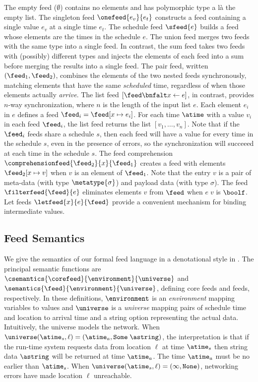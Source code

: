 The empty feed ($\emptyset$) contains no elements and has polymorphic
type a l\`a the empty list.  The singleton feed $\onefeed{e_v}{e_t}$
constructs a feed containing a single value $e_v$ at a single time
$e_t$.  The schedule feed $\sfeed{e}$ builds a feed whose elements 
are the times in the schedule $e$.
The union feed merges two feeds with the same type
into a single feed.  In contrast, the sum feed takes two feeds
with (possibly) different types and injects the elements of each feed
into a sum before merging the results into a single feed.  
The pair feed, written $(\feed_1, \feed_2)$, combines the elements of
the two nested feeds synchronously, matching elements that have the
same {\em scheduled} time, regardless of when those elements
actually {\em arrive}.
The list feed $[\feed \bnfalt x \leftarrow e ]$, in contrast, provides
$n$-way synchronization, where $n$ is the length of the input list
$e$.  Each element $e_i$ in $e$ defines a feed $\feed_i = \feed[x \mapsto e_i]$.
For each time $\atime$ with a value $v_i$ in each feed $\feed_i$, the
list feed returns the list $[v_1, \ldots, v_n]$.  Note that if the
$\feed_i$ feeds share a schedule $s$, then each feed will have a value
for every time in the schedule $s$, even in the presence of errors, so
the synchronization will succeeed at each time in the schedule $s$.
The feed comprehension $\comprehensionfeed{\feed_2}{x}{\feed_1}$
creates a feed with elements $\feed_2[x \mapsto v]$ when $v$ is an
element of $\feed_1$. Note that the entry $v$ is a pair of meta-data
(with type $\metatype{\sigma}$) and payload data (with type $\sigma$).
The feed $\filterfeed{\feed}{e}$ eliminates elements $v$ from $\feed$ when
$e\; v$ is $\boolf$.  Let feeds $\letfeed{x}{e}{\feed}$
provide a convenient mechanism for binding intermediate values. 



\subsection{Feed Semantics}
We give the semantics of our formal feed language in 
a denotational style in .  The principal semantic functions are
$\csemantics{\corefeed}{\environment}{\universe}$ and
$\semantics{\feed}{\environment}{\universe}$, defining core feeds and
feeds, respectively.  In these definitions,
$\environment$ is an {\em environment} mapping variables to values
and $\universe$ is a {\em universe} mapping pairs of
schedule time and location to arrival time and a string option
representing the actual data.
Intuitively, the universe models the network.
When $\universe (\atime_s, \ell) = (\atime_a, \mathtt{Some} \; \astring)$,
 the interpretation is that if the run-time system requests data
from location $\ell$ at time $\atime_s$ then string data $\astring$
will be returned at time $\atime_a$.  The time $\atime_a$ must be
no earlier than $\atime_s$.
When $\universe (\atime_s, \ell) = (\infty, \mathtt{None})$,
networking errors have made location $\ell$ unreachable.

